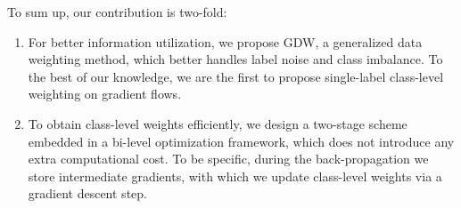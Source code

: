 %
To sum up, our contribution is two-fold:
\begin{enumerate}
    \item For better information utilization, we propose GDW, a generalized data weighting method, which better handles label noise and class imbalance. To the best of our knowledge, we are the first to propose single-label class-level weighting on gradient flows.
    \item To obtain class-level weights efficiently, we design a two-stage scheme embedded in a bi-level optimization framework, which does not introduce any extra computational cost.
    To be specific, during the back-propagation we store intermediate gradients, with which we update class-level weights via a gradient descent step.
\end{enumerate}